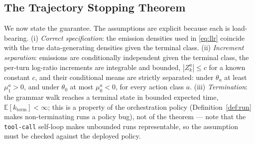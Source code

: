 \subsection{The Trajectory Stopping Theorem}
\label{subsec:theorem}
We now state the guarantee.
The assumptions are explicit because each is load-bearing.
(i) \emph{Correct specification}: the emission densities used in \eqref{eq:llr} coincide with the true data-generating densities given the terminal class.
(ii) \emph{Increment separation}: emissions are conditionally independent given the terminal class, the per-turn log-ratio increments are integrable and bounded, $|Z_k^{a}| \leq c$ for a known constant $c$, and their conditional means are strictly separated: under $\theta_a$ at least $\mu_1^{a} > 0$, and under $\theta_0$ at most $\mu_0^{a} < 0$, for every action class $a$.
(iii) \emph{Termination}: the grammar walk reaches a terminal state in bounded expected time, $\mathbb{E}[k_{\mathrm{term}}] < \infty$; this is a property of the orchestration policy (Definition~\ref{def:run} makes non-terminating runs a policy bug), not of the theorem --- note that the \texttt{tool-call} self-loop makes unbounded runs representable, so the assumption must be checked against the deployed policy.

